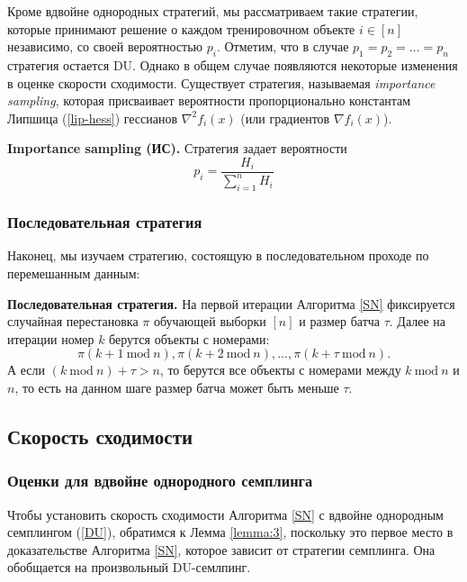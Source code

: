 \documentclass{article}
\theoremstyle{definition}
\theoremstyle{assumption}
\theoremstyle{lemma}
\theoremstyle{theorem}
\theoremstyle{proposition}
\begin{document}
	Кроме вдвойне однородных стратегий, мы рассматриваем такие стратегии, которые принимают решение о каждом тренировочном объекте $i \in [n]$ независимо, со своей вероятностью $p_i$. Отметим, что в случае $p_1 = p_2 =...= p_n$ стратегия остается DU. Однако в общем случае появляются некоторые изменения в оценке скорости сходимости. Существует стратегия, называемая \textit{importance sampling}, которая присваивает вероятности пропорционально константам Липшица (\ref{lip-hess}) гессианов $\nabla^2 f_i(x)$ (или градиентов $\nabla f_i(x)$).
	
	\textbf{Importance sampling (ИС).}\label{imp-hess} Стратегия задает вероятности
	\begin{equation}
		p_i = \frac{H_i}{\sum \limits_{i=1}^n H_i}
	\end{equation}
	
	\subsubsection{Последовательная стратегия}
	
	Наконец, мы изучаем стратегию, состоящую в последовательном проходе по перемешанным данным:
	
	\textbf{Последовательная стратегия.}\label{consec} На первой итерации Алгоритма \ref{SN} фиксируется случайная перестановка $\pi$ обучающей выборки $[n]$ и размер батча $\tau$. Далее на итерации номер $k$ берутся объекты с номерами:
	\begin{equation}
		\pi(k+1\ \text{mod}\ n), \pi(k+2\ \text{mod}\ n), ..., \pi(k+\tau\ \text{mod}\ n).
	\end{equation}
	А если $(k\ \text{mod}\ n) + \tau > n$, то берутся все объекты с номерами между $k\ \text{mod}\ n$ и $n$, то есть на данном шаге размер батча может быть меньше $\tau$.
	
	\subsection {Скорость сходимости}
	
	\subsubsection{Оценки для вдвойне однородного семплинга}
	
	Чтобы установить скорость сходимости Алгоритма \ref{SN} с вдвойне однородным семплингом (\ref{DU}), обратимся к Лемма \ref{lemma:3}, поскольку это первое место в доказательстве Алгоритма \ref{SN}, которое зависит от стратегии семплинга. Она обобщается на произвольный DU-семлпинг.
	
\end{document}
